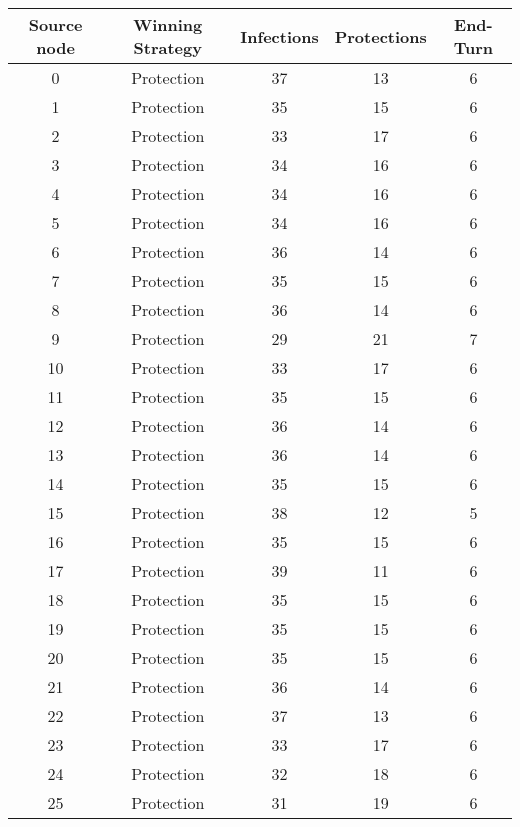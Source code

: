 \documentclass[results.tex]{subfiles}
\begin{document}
\begin{center}
  \begin{tabular}{| c || c | c | c | c |}
    \hline
    {\bfseries Source node} & {\bfseries Winning Strategy} & {\bfseries Infections} & {\bfseries Protections} & {\bfseries End-Turn} \\  %
    \hline\hline
    0 & Protection & 37 & 13 & 6 \\ 
    \hline
    1 & Protection & 35 & 15 & 6 \\ 
    \hline
    2 & Protection & 33 & 17 & 6 \\ 
    \hline
    3 & Protection & 34 & 16 & 6 \\ 
    \hline
    4 & Protection & 34 & 16 & 6 \\ 
    \hline
    5 & Protection & 34 & 16 & 6 \\ 
    \hline
    6 & Protection & 36 & 14 & 6 \\ 
    \hline
    7 & Protection & 35 & 15 & 6 \\ 
    \hline
    8 & Protection & 36 & 14 & 6 \\ 
    \hline
    9 & Protection & 29 & 21 & 7 \\ 
    \hline
    10 & Protection & 33 & 17 & 6 \\ 
    \hline
    11 & Protection & 35 & 15 & 6 \\ 
    \hline
    12 & Protection & 36 & 14 & 6 \\ 
    \hline
    13 & Protection & 36 & 14 & 6 \\ 
    \hline
    14 & Protection & 35 & 15 & 6 \\ 
    \hline
    15 & Protection & 38 & 12 & 5 \\ 
    \hline
    16 & Protection & 35 & 15 & 6 \\ 
    \hline
    17 & Protection & 39 & 11 & 6 \\ 
    \hline
    18 & Protection & 35 & 15 & 6 \\ 
    \hline
    19 & Protection & 35 & 15 & 6 \\ 
    \hline
    20 & Protection & 35 & 15 & 6 \\ 
    \hline
    21 & Protection & 36 & 14 & 6 \\ 
    \hline
    22 & Protection & 37 & 13 & 6 \\ 
    \hline
    23 & Protection & 33 & 17 & 6 \\ 
    \hline
    24 & Protection & 32 & 18 & 6 \\ 
    \hline
    25 & Protection & 31 & 19 & 6 \\ 

\end{tabular}
\end{center}
\end{document}
